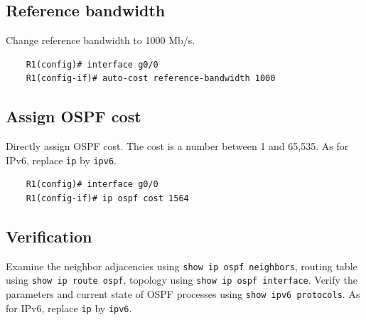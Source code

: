 \subsection{Reference bandwidth}	

Change reference bandwidth to 1000 Mb/s.
	\begin{verbatim}
	R1(config)# interface g0/0
	R1(config-if)# auto-cost reference-bandwidth 1000
	\end{verbatim}
	
\subsection{Assign OSPF cost}	

Directly assign OSPF cost. The cost is a number between 1 and 65,535. As for IPv6, replace \verb|ip| by \verb|ipv6|.
	\begin{verbatim}
	R1(config)# interface g0/0
	R1(config-if)# ip ospf cost 1564
	\end{verbatim}

\subsection{Verification}
Examine the neighbor adjacencies using \verb|show ip ospf neighbors|, routing table using \verb|show ip route ospf|, topology using \verb|show ip ospf interface|. Verify the parameters and current state of OSPF processes using \verb|show ipv6 protocols|.	As for IPv6, replace \verb|ip| by \verb|ipv6|.